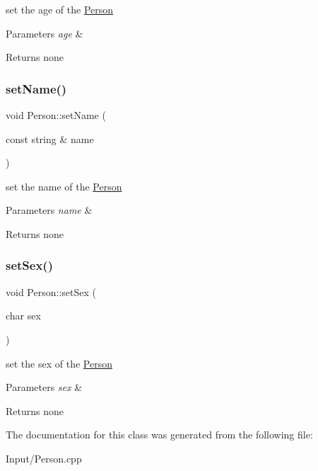 set the age of the \hyperlink{classPerson}{Person}


\begin{DoxyParams}{Parameters}
{\em age} & \\
\hline
\end{DoxyParams}
\begin{DoxyReturn}{Returns}
none 
\end{DoxyReturn}
\mbox{\label{classPerson_a4b39c1f5d600b1e41ef95c09f4b42935}} 
\subsubsection{\texorpdfstring{set\+Name()}{setName()}}
{\footnotesize\ttfamily void Person\+::set\+Name (\begin{DoxyParamCaption}\item[{const string \&}]{name }\end{DoxyParamCaption})\hspace{0.3cm}{\ttfamily [inline]}}

set the name of the \hyperlink{classPerson}{Person}


\begin{DoxyParams}{Parameters}
{\em name} & \\
\hline
\end{DoxyParams}
\begin{DoxyReturn}{Returns}
none 
\end{DoxyReturn}
\mbox{\label{classPerson_aa8c70c136001ef24d5cb7ae4819485b5}} 
\subsubsection{\texorpdfstring{set\+Sex()}{setSex()}}
{\footnotesize\ttfamily void Person\+::set\+Sex (\begin{DoxyParamCaption}\item[{char}]{sex }\end{DoxyParamCaption})\hspace{0.3cm}{\ttfamily [inline]}}

set the sex of the \hyperlink{classPerson}{Person}


\begin{DoxyParams}{Parameters}
{\em sex} & \\
\hline
\end{DoxyParams}
\begin{DoxyReturn}{Returns}
none 
\end{DoxyReturn}


The documentation for this class was generated from the following file\+:\begin{DoxyCompactItemize}
\item 
Input/Person.\+cpp\end{DoxyCompactItemize}

